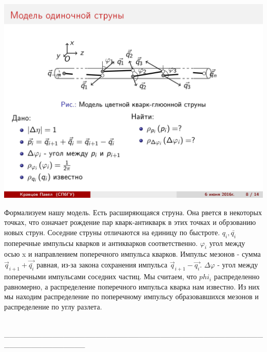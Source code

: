 \documentclass[14pt]{article}
\renewcommand{\phi}{\varphi}
\renewcommand{\line}{\\ \_\_\_\_\_\_\_\_\_\_\_\_\_\_\_\_\_\_\_\_\_\_\_\_\_\_\_\_\_\_\_\_\_\_\_\_\_\_\_\_\_\_\_\_\_\_\_\_\_\_\_\_\_\_\_\_\_\_\_\_\_\_\_ \\ }
\begin{document}
\begin{minipage}[h]{0.5\linewidth}
\includegraphics[width=1\linewidth]{page-08.jpg}
\end{minipage}
\begin{minipage}[h]{0.45\linewidth}
Формализуем нашу модель. Есть расширяющаяся струна. Она рвется в некоторых точках, что означает рождение пар кварк-антикварк в этих точках и обрзованию новых струн. Соседние струны отличаются на единицу по быстроте. $q_i, \bar{q_i}$ поперечные импульсы кварков и антикварков соответственно. $\phi_i$ угол между осью x и направлением поперечного импульса кварков. Импульс мезонов - сумма  $\vec{q}_{i+1} + \vec{\bar{q_i}}$ равная, из-за закона сохранения импульса $\vec{q}_{i+1} - \vec{q_i}$. $\Delta \phi$ - угол между поперечными импульсами соседних частиц. Мы считаем, что $phi_i$ распределенно равномерно, а распределение поперечного импульса кварка нам известно. Из них мы находим распределение по поперечному импульсу образовавшихся мезонов и распределение по углу разлета.
\end{minipage}
\line
\end{document}
